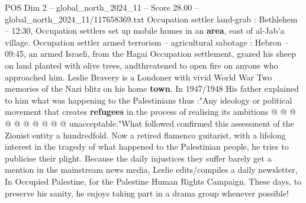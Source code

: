 \begin{textsample}{POS Dim 2 – global\_north\_2024\_11 – Score 28.00 – global\_north\_2024\_11/117658369.txt}
Occupation settler land-grab : Bethlehem -- 12:30, Occupation settlers set up mobile homes in an \textbf{area}, east of al-Jab'a village.
Occupation settler armed terrorism -- agricultural sabotage : Hebron -- 09:45, an armed Israeli, from the Hagai Occupation settlement, grazed his sheep on land planted with olive trees, andthreatened to open fire on anyone who approached him.
Leslie Bravery is a Londoner with vivid World War Two memories of the Nazi blitz on his home \textbf{town}.
In 1947/1948 His father explained to him what was happening to the Palestinians thus :"Any ideology or political movement that creates \textbf{refugees} in the process of realising its ambitions @ @ @ @ @ @ @ @ @ @ unacceptable."What followed confirmed this assessment of the Zionist entity a hundredfold.
Now a retired flamenco guitarist, with a lifelong interest in the tragedy of what happened to the Palestinian people, he tries to publicise their plight.
Because the daily injustices they suffer barely get a mention in the mainstream news media, Leslie edits/compiles a daily newsletter, In Occupied Palestine, for the Palestine Human Rights Campaign.
These days, to preserve his sanity, he enjoys taking part in a drama group whenever possible!

\end{textsample}
